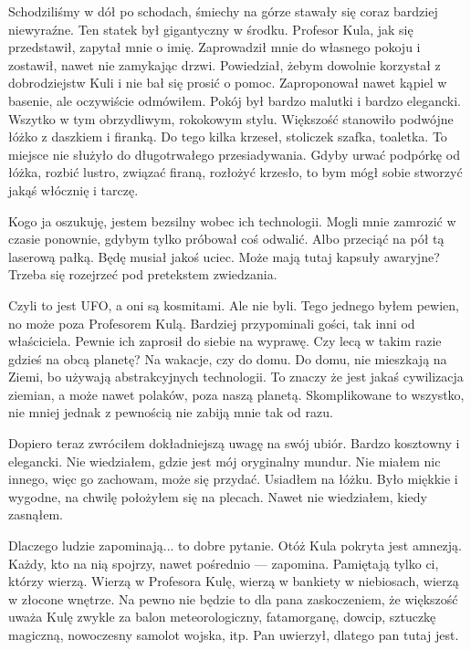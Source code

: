 Schodziliśmy w dół po schodach, śmiechy na górze stawały się coraz bardziej niewyraźne.
Ten statek był gigantyczny w środku. Profesor Kula, jak się przedstawił, zapytał mnie o imię.
Zaprowadził mnie do własnego pokoju i zostawił, nawet nie zamykając drzwi. Powiedział, żebym
dowolnie korzystał z dobrodziejstw Kuli i nie bał się prosić o pomoc. Zaproponował nawet kąpiel w basenie, ale oczywiście odmówiłem.
Pokój był bardzo malutki i bardzo elegancki.
Wszytko w tym obrzydliwym, rokokowym stylu.
Większość stanowiło podwójne łóżko z daszkiem i firanką.
Do tego kilka krzeseł, stoliczek szafka, toaletka.
To miejsce nie służyło do długotrwałego przesiadywania.
Gdyby urwać podpórkę od łóżka, rozbić lustro, związać firaną, rozłożyć krzesło, to bym mógł sobie stworzyć jakąś włócznię i tarczę.

Kogo ja oszukuję, jestem bezsilny wobec ich technologii.
Mogli mnie zamrozić w czasie ponownie, gdybym tylko próbował coś odwalić.
Albo przeciąć na pół tą laserową pałką.
Będę musiał jakoś uciec. Może mają tutaj kapsuły awaryjne?
Trzeba się rozejrzeć pod pretekstem zwiedzania.

Czyli to jest UFO, a oni są kosmitami. 
Ale nie byli. Tego jednego byłem pewien, no może poza Profesorem Kulą.
Bardziej przypominali gości, tak inni od właściciela. Pewnie ich zaprosił do siebie na wyprawę.
Czy lecą w takim razie gdzieś na obcą planetę?
Na wakacje, czy do domu.
Do domu, nie mieszkają na Ziemi, bo używają abstrakcyjnych technologii.
To znaczy że jest jakaś cywilizacja ziemian, a może nawet polaków, poza naszą planetą.
Skomplikowane to wszystko, nie mniej jednak z pewnością nie zabiją mnie tak od razu.

Dopiero teraz zwróciłem dokładniejszą uwagę na swój ubiór.
Bardzo kosztowny i elegancki. Nie wiedziałem, gdzie jest mój oryginalny mundur. Nie miałem nic innego, więc go zachowam, może się przydać.
Usiadłem na łóżku. Było miękkie i wygodne, na chwilę położyłem się na plecach.
Nawet nie wiedziałem, kiedy zasnąłem.



Dlaczego ludzie zapominają... to dobre pytanie.
Otóż Kula pokryta jest amnezją. Każdy, kto na nią spojrzy, nawet pośrednio --- zapomina.
Pamiętają tylko ci, którzy wierzą. Wierzą w Profesora Kulę, wierzą w bankiety w niebiosach, wierzą w złocone wnętrze.
Na pewno nie będzie to dla pana zaskoczeniem, że większość uważa Kulę zwykle za balon meteorologiczny, fatamorganę, dowcip, sztuczkę magiczną, nowoczesny samolot wojska, itp.
Pan uwierzył, dlatego pan tutaj jest.






